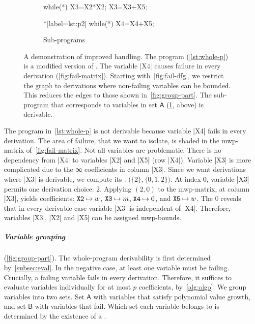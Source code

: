 \begin{figure}
\begin{subfigure}{\textwidth}
{\begin{minipage}{.35\textwidth}
\begin{implisting}
while(*) {
  X3=X2*X2;
  X3=X3+X5; }
\end{implisting}
\end{minipage}%
\hspace{2em}%
\begin{minipage}{.35\textwidth}
\begin{implisting}*[label={lst:p2}]
while(*) {
  X4=X4+X5;
}
\end{implisting}
\end{minipage}
\caption{Sub-programs}\label{lst:sub-progs}
}\end{subfigure}
\caption[A demonstration of improved derivation failure handling]{
A demonstration of improved  handling. The program
(\ref{lst:whole-p}) is a modified version of \exname. The variable \pr|X4|
causes failure in every derivation (\ref{fig:fail-matrix}). Starting
with~\ref{fig:fail-dfg}, we restrict the graph to derivations where non-failing
variables can be bounded. This reduces the edges to those shown
in~\ref{fig:group-part}. The sub-program that corresponds to variables in set
\(\mathsf{A}\) (\ref{lst:sub-progs}, above) is derivable.
}\label{fig:part-prog}
\end{figure}

\begin{example}\label{ex:whl}
The program in~\autoref{lst:whole-p} is not derivable because variable \pr|X4| fails in every derivation.
The area of failure, that we want to isolate, is shaded in the mwp-matrix of~\autoref{fig:fail-matrix}.
Not all variables are problematic.
There is no dependency from \pr|X4| to variables \pr|X2| and \pr|X5| (row \pr|X4|).
Variable \pr|X3| is more complicated due to the ∞ coefficients in column \pr|X3|.
Since we want derivations where \pr|X3| is derivable, we compute its : \(\big(\{2\}, \{0,1,2\}\big)\).
At index 0, variable \pr|X3| permits one derivation choice: 2.
Applying \((2,0)\) to the mwp-matrix, at column \pr|X3|, yields coefficients:
\(\text{\pr|X2|} \mapsto w\),
\(\text{\pr|X3|} \mapsto m\),
\(\text{\pr|X4|} \mapsto 0\), and
\(\text{\pr|X5|} \mapsto w\).
The \(0\) reveals that in every derivable case variable \pr|X3| is independent of \pr|X4|.
Therefore, variables \pr|X3|, \pr|X2| and \pr|X5| can be assigned mwp-bounds.
\end{example}

\subparagraph*{Variable grouping} (\autoref{fig:group-part}).
The whole-program derivability is first determined by~\autoref{subsec:eval}.
In the negative case, at least one variable must be failing.
Crucially, a failing variable fails in {every derivation}.
Therefore, it suffices to evaluate variables individually for at most \(p\) coefficients, by~\autoref{alg:algo}.
We group variables into two sets.
Set \(\mathsf{A}\) with variables that satisfy polynomial value growth, and set \(\mathsf{B}\) with variables that fail.
Which set each variable belongs to is determined by the existence of a .

